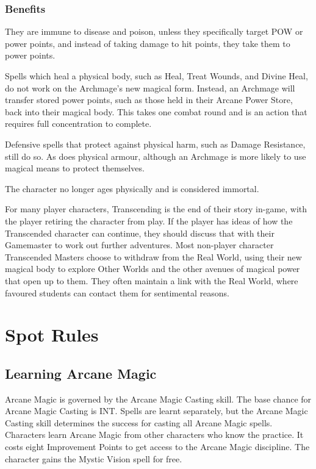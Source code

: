 \subsubsection{Benefits}
\begin{rpg-list}
\item They are immune to disease and poison, unless they specifically target POW or power points, and instead of taking damage to hit points, they take them to power points.
\item Spells which heal a physical body, such as Heal, Treat Wounds, and Divine Heal, do not work on the Archmage’s new magical form. Instead, an Archmage will transfer stored power points, such as those held in their Arcane Power Store, back into their magical body. This takes one combat round and is an action that requires full concentration to complete.
\item Defensive spells that protect against physical harm, such as Damage Resistance, still do so. As does physical armour, although an Archmage is more likely to use magical means to protect themselves.
\item The character no longer ages physically and is considered immortal.
\end{rpg-list}

For many player characters, Transcending is the end of their story in-game, with the player retiring the character from play. If the player has ideas of how the Transcended character can continue, they should discuss that with their Gamemaster to work out further adventures. Most non-player character Transcended Masters choose to withdraw from the Real World, using their new magical body to explore Other Worlds and the other avenues of magical power that open up to them. They often maintain a link with the Real World, where favoured students can contact them for sentimental reasons.



\section{Spot Rules}

\subsection{Learning Arcane Magic}
Arcane Magic is governed by the Arcane Magic Casting skill. The base chance for Arcane Magic Casting is INT. Spells are learnt separately, but the Arcane Magic Casting skill determines the success for casting all Arcane Magic spells. Characters learn Arcane Magic from other characters who know the practice. It costs eight Improvement Points to get access to the Arcane Magic discipline. The character gains the Mystic Vision spell for free.

